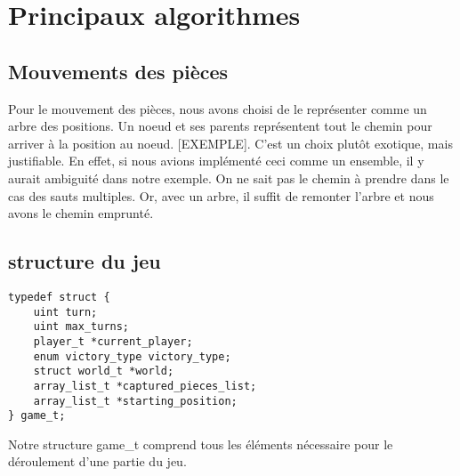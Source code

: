 \section*{Principaux algorithmes}
\subsection*{Mouvements des pièces}
Pour le mouvement des pièces, nous avons choisi de le représenter comme
un arbre des positions. Un noeud et ses parents représentent tout le 
chemin pour arriver à la position au noeud. [EXEMPLE]. C'est un choix
plutôt exotique, mais justifiable. En effet, si nous avions implémenté
ceci comme un ensemble, il y aurait ambiguité dans notre exemple.
On ne sait pas le chemin à prendre dans le cas des sauts multiples. Or,
avec un arbre, il suffit de remonter l'arbre et nous avons le chemin
emprunté.


\subsection*{structure du jeu}

\begin{verbatim}
typedef struct {
    uint turn;
    uint max_turns;
    player_t *current_player;
    enum victory_type victory_type;
    struct world_t *world;
    array_list_t *captured_pieces_list;
    array_list_t *starting_position;
} game_t;
\end{verbatim}


Notre structure game\_t comprend tous les éléments nécessaire pour le déroulement d'une partie du jeu.


